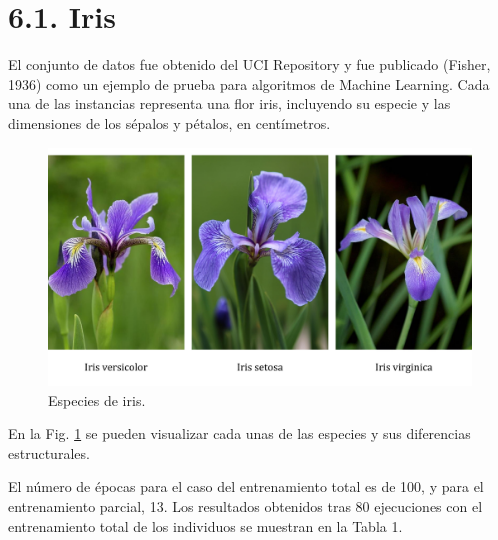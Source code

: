 \documentclass[spanish,a4paper,12pt,twoside]{report}
\begin{document}
  \section*{\Large 6.1. Iris}
  El conjunto de datos fue obtenido del UCI Repository y fue publicado (Fisher, 1936) como un ejemplo de prueba para algoritmos de Machine Learning. Cada una de las instancias representa una flor iris, incluyendo su especie y las dimensiones de los sépalos y pétalos, en centímetros. \par
  \begin{figure}[H]
    \centering
    \includegraphics[width = 1\textwidth]{resources/Fig17.pdf}
    \caption{Especies de iris.}
    \label{fig:17}
  \end{figure} \vfill
  En la Fig. \ref{fig:17} se pueden visualizar cada unas de las especies y sus diferencias estructurales. \par
  El número de épocas para el caso del entrenamiento total es de 100, y para el entrenamiento parcial, 13. Los resultados obtenidos tras 80 ejecuciones con el entrenamiento total de los individuos se muestran en la Tabla 1.
\end{document}
